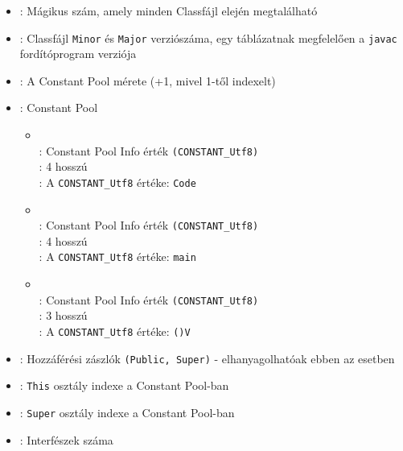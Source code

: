 \begin{itemize}
\setlength\itemsep{-5px}
\item {}: Mágikus szám, amely minden Classfájl elején megtalálható
\item {} : Classfájl \lstinline{Minor} és \lstinline{Major} verziószáma, egy táblázatnak megfelelően a \lstinline{javac} fordítóprogram verziója
\item {}: A Constant Pool mérete (+1, mivel 1-től indexelt)
\item {}: Constant Pool
\begin{itemize}
    \setlength\itemsep{-5px}
    \item {}   \\
    : Constant Pool Info érték \lstinline{(CONSTANT_Utf8)} \\
    : 4 hosszú \\
    : A \lstinline{CONSTANT_Utf8} értéke: \lstinline{Code}
    \item {}   \\
    : Constant Pool Info érték \lstinline{(CONSTANT_Utf8)} \\
    : 4 hosszú \\
    : A \lstinline{CONSTANT_Utf8} értéke: \lstinline{main}
    \item {}   \\
    : Constant Pool Info érték \lstinline{(CONSTANT_Utf8)} \\
    : 3 hosszú \\
    : A \lstinline{CONSTANT_Utf8} értéke: \lstinline{()V}
\end{itemize}
\item {}: Hozzáférési zászlók \lstinline{(Public, Super)} - elhanyagolhatóak ebben az esetben
\item {}: \lstinline{This} osztály indexe a Constant Pool-ban
\item {}: \lstinline{Super} osztály indexe a Constant Pool-ban
\item {}: Interfészek száma

\end{itemize}
